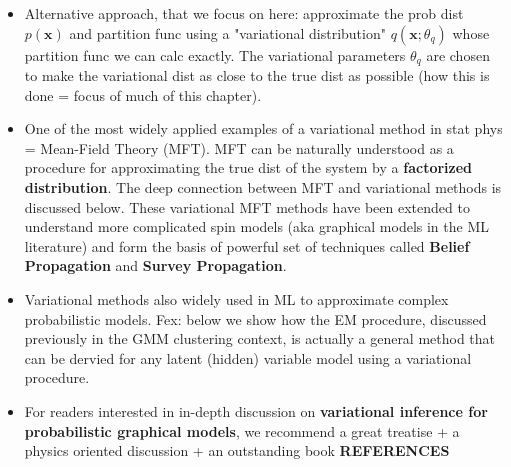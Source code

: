\documentclass[norsk,a4paper,11pt]{article}
\begin{document}
\begin{itemize}
	\item Alternative approach, that we focus on here: approximate the prob dist $p(\bm{x})$ and partition func using a "variational distribution" $q(\bm{x}; \theta_q)$ whose partition func we can calc exactly. The variational parameters $\theta_q$ are chosen to make the variational dist as close to the true dist as possible (how this is done = focus of much of this chapter).
	\item One of the most widely applied examples of a variational method in stat phys = Mean-Field Theory (MFT). MFT can be naturally understood as a procedure for approximating the true dist of the system by a \textbf{factorized distribution}. The deep connection between MFT and variational methods is discussed below. These variational MFT methods have been extended to understand more complicated spin models (aka graphical models in the ML literature) and form the basis of powerful set of techniques called \textbf{Belief Propagation} and \textbf{Survey Propagation}.
	\item Variational methods also widely used in ML to approximate complex probabilistic models. Fex: below we show how the EM procedure, discussed previously in the GMM clustering context, is actually a general method that can be dervied for any latent (hidden) variable model using a variational procedure.
	\item For readers interested in in-depth discussion on \textbf{variational inference for probabilistic graphical models}, we recommend a great treatise + a physics oriented discussion + an outstanding book \textbf{REFERENCES}
\end{itemize}
\end{document}
